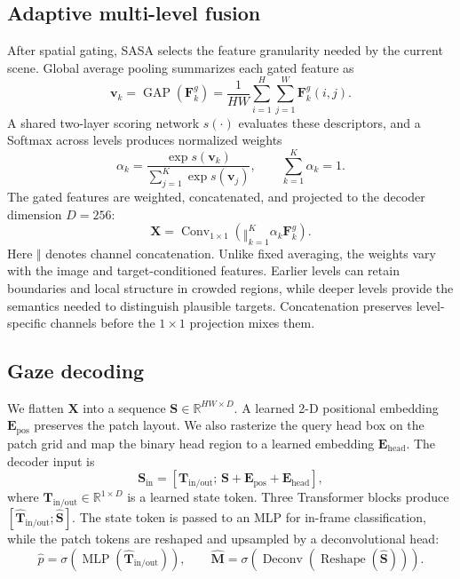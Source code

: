\documentclass{article}
\begin{document}
\subsection{Adaptive multi-level fusion}
After spatial gating, SASA selects the feature granularity needed by the current scene. Global average pooling summarizes each gated feature as
\begin{equation}
  \mathbf v_k=\operatorname{GAP}(\mathbf F_k^g)
  =\frac{1}{HW}\sum_{i=1}^{H}\sum_{j=1}^{W}\mathbf F_k^g(i,j).
  \label{eq:gap}
\end{equation}
A shared two-layer scoring network $s(\cdot)$ evaluates these descriptors, and a Softmax across levels produces normalized weights
\begin{equation}
  \alpha_k=\frac{\exp s(\mathbf v_k)}{\sum_{j=1}^{K}\exp s(\mathbf v_j)},
  \qquad \sum_{k=1}^{K}\alpha_k=1.
  \label{eq:weights}
\end{equation}
The gated features are weighted, concatenated, and projected to the decoder dimension $D=256$:
\begin{equation}
  \mathbf X=\operatorname{Conv}_{1\times1}\!\left(
  \mathop{\Vert}_{k=1}^{K}\alpha_k\mathbf F_k^g\right).
  \label{eq:sasa}
\end{equation}
Here $\Vert$ denotes channel concatenation. Unlike fixed averaging, the weights vary with the image and target-conditioned features. Earlier levels can retain boundaries and local structure in crowded regions, while deeper levels provide the semantics needed to distinguish plausible targets. Concatenation preserves level-specific channels before the $1\times1$ projection mixes them.

\subsection{Gaze decoding}
We flatten $\mathbf X$ into a sequence $\mathbf S\in\mathbb R^{HW\times D}$. A learned 2-D positional embedding $\mathbf E_{\mathrm{pos}}$ preserves the patch layout. We also rasterize the query head box on the patch grid and map the binary head region to a learned embedding $\mathbf E_{\mathrm{head}}$. The decoder input is
\begin{equation}
  \mathbf S_{\mathrm{in}}=
  [\mathbf T_{\mathrm{in/out}};\,\mathbf S+\mathbf E_{\mathrm{pos}}+\mathbf E_{\mathrm{head}}],
  \label{eq:decoder_input}
\end{equation}
where $\mathbf T_{\mathrm{in/out}}\in\mathbb R^{1\times D}$ is a learned state token. Three Transformer blocks produce $[\hat{\mathbf T}_{\mathrm{in/out}};\hat{\mathbf S}]$. The state token is passed to an MLP for in-frame classification, while the patch tokens are reshaped and upsampled by a deconvolutional head:
\begin{equation}
  \hat p=\sigma(\operatorname{MLP}(\hat{\mathbf T}_{\mathrm{in/out}})),\qquad
  \hat{\mathbf M}=\sigma(\operatorname{Deconv}(\operatorname{Reshape}(\hat{\mathbf S}))).
  \label{eq:predictions}
\end{equation}
\end{document}
